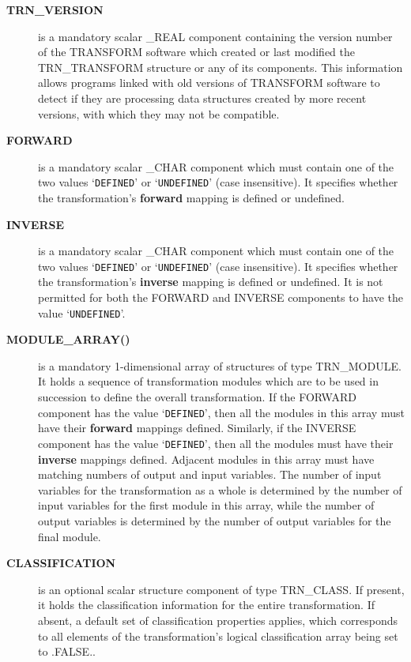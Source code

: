 \documentclass[twoside,nolof,11pt]{starlink}
\providecommand{\name}[1]{\small{#1}}
\begin{document}
\begin{description}

\item[\textbf{\name{TRN\_VERSION}}] is a mandatory scalar \name{\_REAL} component
containing the version number of the \name{TRANSFORM} software which created
or last modified the \name{TRN\_TRANSFORM} structure or any of its
components.
This information allows programs linked with old versions of
\name{TRANSFORM} software to detect if they are processing data structures
created by more recent versions, with which they may not be compatible.

\item[\textbf{\name{FORWARD}}] is a mandatory scalar \name{\_CHAR} component which
must contain one of the two values `\verb#DEFINED#' or `\verb#UNDEFINED#' (case
insensitive).
It specifies whether the transformation's \textbf{forward} mapping is defined
or undefined.

\item[\textbf{\name{INVERSE}}] is a mandatory scalar \name{\_CHAR} component which
must contain one of the two values `\verb#DEFINED#' or `\verb#UNDEFINED#' (case
insensitive).
It specifies whether the transformation's \textbf{inverse} mapping is defined
or undefined.
It is not permitted for both the \name{FORWARD} and \name{INVERSE}
components to have the value `\verb#UNDEFINED#'.

\item[\textbf{\name{MODULE\_ARRAY()}}] is a mandatory 1-dimensional array of
structures of type \name{TRN\_MODULE}.
It holds a sequence of transformation modules which are to be used in
succession to define the overall transformation.
If the \name{FORWARD} component has the value `\verb#DEFINED#', then all the
modules in this array must have their \textbf{forward} mappings defined.
Similarly, if the \name{INVERSE} component has the value `\verb#DEFINED#', then
all the modules must have their \textbf{inverse} mappings defined.
Adjacent modules in this array must have matching numbers of output and input
variables.
The number of input variables for the transformation as a whole is
determined by the number of input variables for the first module in this
array, while the number of output variables is determined by the number of
output variables for the final module.

\item[\textbf{\name{CLASSIFICATION}}] is an optional scalar structure component
of type \name{TRN\_CLASS}.  If present, it holds the classification
information for the entire transformation.  If absent, a default set of
classification properties applies, which corresponds to all elements of the
transformation's logical classification array being set to \name{.FALSE.}.

\end{description}
\end{document}
